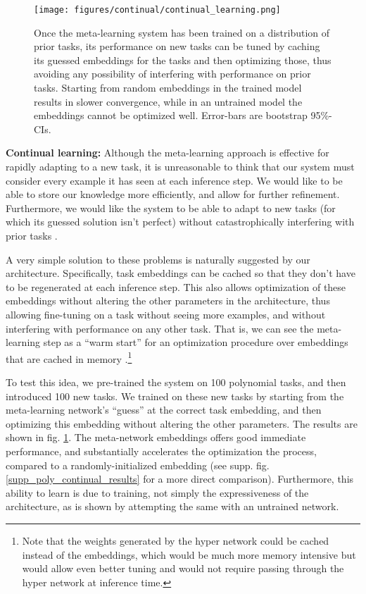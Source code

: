 \documentclass{article}
\begin{document}
\begin{figure}
\centering
\texttt{[image: figures/continual/continual\_learning.png]}
\caption{Once the meta-learning system has been trained on a distribution of prior tasks, its performance on new tasks can be tuned by caching its guessed embeddings for the tasks and then optimizing those, thus avoiding any possibility of interfering with performance on prior tasks. Starting from random embeddings in the trained model results in slower convergence, while in an untrained model the embeddings cannot be optimized well. Error-bars are bootstrap 95\%-CIs.}
\label{poly_continual_results}
\end{figure}
\textbf{Continual learning:} Although the meta-learning approach is effective for rapidly adapting to a new task, it is unreasonable to think that our system must consider every example it has seen at each inference step. We would like to be able to store our knowledge more efficiently, and allow for further refinement. Furthermore, we would like the system to be able to adapt to new tasks (for which its guessed solution isn't perfect) without catastrophically interfering with prior tasks \citep{McCloskey1989}. \par
A very simple solution to these problems is naturally suggested by our architecture. Specifically, task embeddings can be cached so that they don't have to be regenerated at each inference step. This also allows optimization of these embeddings without altering the other parameters in the architecture, thus allowing fine-tuning on a task without seeing more examples, and without interfering with performance on any other task. That is, we can see the meta-learning step as a ``warm start'' for an optimization procedure over embeddings that are cached in memory \citep[c.f.][]{Kumaran2016}.\footnote{Note that the weights generated by the hyper network could be cached instead of the embeddings, which would be much more memory intensive but would allow even better tuning and would not require passing through the hyper network at inference time.} \par 
To test this idea, we pre-trained the system on 100 polynomial tasks, and then introduced 100 new tasks. We trained on these new tasks by starting from the meta-learning network's ``guess'' at the correct task embedding, and then optimizing this embedding without altering the other parameters. The results are shown in fig. \ref{poly_continual_results}. The meta-network embeddings offers good immediate performance, and substantially accelerates the optimization the process, compared to a randomly-initialized embedding (see supp. fig. \ref{supp_poly_continual_results} for a more direct comparison). Furthermore, this ability to learn is due to training, not simply the expressiveness of the architecture, as is shown by attempting the same with an untrained network. \par 
\end{document}
